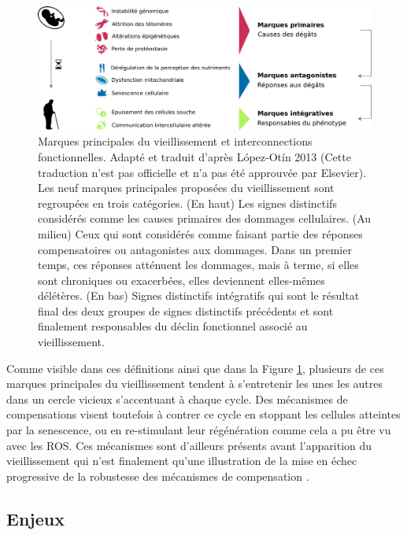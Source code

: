\begin{figure}[h!]
    \centering
    \includegraphics[width=\textwidth]{img/intro/4_aging/intro_4_aging_Lopez-Otin_hallmarks.pdf}
    \caption{Marques principales du vieillissement et interconnections fonctionnelles. Adapté et traduit d'après López-Otín 2013 \cite{Lopez-Otin2013} (Cette traduction n'est pas officielle et n'a pas été approuvée par Elsevier). Les neuf marques principales proposées du vieillissement sont regroupées en trois catégories. (En haut) Les signes distinctifs considérés comme les causes primaires des dommages cellulaires. (Au milieu) Ceux qui sont considérés comme faisant partie des réponses compensatoires ou antagonistes aux dommages. Dans un premier temps, ces réponses atténuent les dommages, mais à terme, si elles sont chroniques ou exacerbées, elles deviennent elles-mêmes délétères. (En bas) Signes distinctifs intégratifs qui sont le résultat final des deux groupes de signes distinctifs précédents et sont finalement responsables du déclin fonctionnel associé au vieillissement.}
    \label{fig:hallmarks_aging}
\end{figure}

Comme visible dans ces définitions ainsi que dans la Figure \ref{fig:hallmarks_aging}, plusieurs de ces marques principales du vieillissement tendent à s'entretenir les unes les autres dans un cercle vicieux s'accentuant à chaque cycle. Des mécanismes de compensations visent toutefois à contrer ce cycle en stoppant les cellules atteintes par la senescence, ou en re-stimulant leur régénération comme cela a pu être vu avec les ROS. Ces mécanismes sont d'ailleurs présents avant l'apparition du vieillissement qui n'est finalement qu'une illustration de la mise en échec progressive de la robustesse des mécanismes de compensation \cite{Ferrucci2020Feb}.




\subsection{Enjeux}

